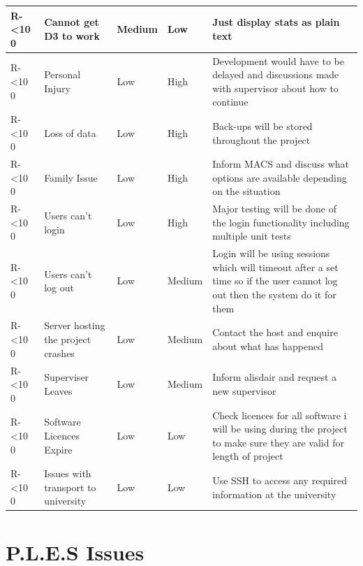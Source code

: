\documentclass[12pt]{article}  %
\newcommand{\rid}[1]{\centering #1-\ifnum\value{requirement}<10 0\fi\arabic{requirement} \stepcounter{requirement}}
\begin{document}
\begin{spacing}{1.5}
\begin{longtable}{|p{}|p{}|p{}|p{}|p{}|}
\rid{R} & Cannot get D3 to work & Medium & Low & Just display stats as plain text\\ \hline



\rid{R} & Personal Injury & Low & High & Development would have to be delayed and discussions made with supervisor about how to continue\\ \hline

\rid{R} & Loss of data & Low & High & Back-ups will be stored throughout the project\\
\hline

\rid{R} & Family Issue & Low & High  & Inform MACS and discuss what options are available depending on the situation \\ \hline

\rid{R} & Users can't login & Low & High & Major testing will be done of the login functionality including multiple unit tests\\ \hline

\rid{R} & Users can't log out & Low & Medium & Login will be using sessions which will timeout after a set time so if the user cannot log out then the system do it for them\\ \hline

\rid{R} & Server hosting the project crashes & Low & Medium & Contact the host and enquire about what has happened\\ \hline

\rid{R} & Superviser Leaves & Low & Medium & Inform alisdair and request a new supervisor\\ \hline

\rid{R} & Software Licences Expire & Low & Low & Check licences for all software i will be using during the project to make sure they are valid for length of project\\ \hline

\rid{R} & Issues with transport to university  & Low & Low & Use SSH to access any required information at the university  \\ \hline

\end{longtable}
\end{spacing}






\newpage


\section{P.L.E.S Issues}
\end{document}
